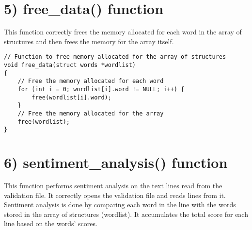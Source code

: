 \documentclass[a4paper,11pt]{article}
\theoremstyle{mytheor}
\begin{document}
\section*{5) free\_data() function}
This function correctly frees the memory allocated for each word in the array of structures and then frees the memory for the array itself.
\begin{lstlisting}[label={list:fifth},caption=free\_data() function]
// Function to free memory allocated for the array of structures
void free_data(struct words *wordlist)
{
    // Free the memory allocated for each word
    for (int i = 0; wordlist[i].word != NULL; i++) {
        free(wordlist[i].word);
    }
    // Free the memory allocated for the array
    free(wordlist);
}
\end{lstlisting}

\section*{6) sentiment\_analysis() function}
This function performs sentiment analysis on the text lines read from the validation file. It correctly opens the validation file and reads lines from it. Sentiment analysis is done by comparing each word in the line with the words stored in the array of structures (wordlist). It accumulates the total score for each line based on the words' scores.
\end{document}
